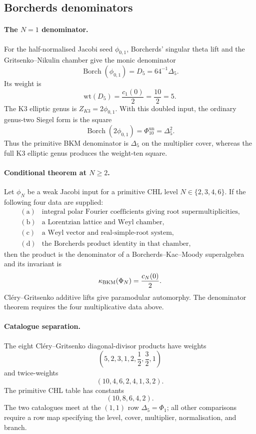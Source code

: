\subsection*{Borcherds denominators}
\label{subsec:conj1-borcherds-denominators}

\paragraph{The \(N=1\) denominator.}
For the half-normalised Jacobi seed \(\phi_{0,1}\), Borcherds'
singular theta lift and the Gritsenko--Nikulin chamber give the monic
denominator
\[
        \operatorname{Borch}(\phi_{0,1})=D_5=64^{-1}\Delta_5 .
\]
Its weight is
\[
        \mathrm{wt}(D_5)=\frac{c_1(0)}{2}=\frac{10}{2}=5 .
\]
The K3 elliptic genus is \(Z_{K3}=2\phi_{0,1}\).  With this doubled input,
the ordinary genus-two Siegel form is the square
\[
        \operatorname{Borch}(2\phi_{0,1})
        =
        \Phi_{10}^{\mathrm{un}}
        =
        \Delta_5^2 .
\]
Thus the primitive BKM denominator is \(\Delta_5\) on the multiplier cover,
whereas the full K3 elliptic genus produces the weight-ten square.

\paragraph{Conditional theorem at \(N\geq 2\).}
Let \(\phi_N\) be a weak Jacobi input for a primitive CHL level
\(N\in\{2,3,4,6\}\).  If the following four data are supplied:
\[
\begin{array}{ll}
\mathrm{(a)}&\text{integral polar Fourier coefficients giving root
supermultiplicities,}\\
\mathrm{(b)}&\text{a Lorentzian lattice and Weyl chamber,}\\
\mathrm{(c)}&\text{a Weyl vector and real-simple-root system,}\\
\mathrm{(d)}&\text{the Borcherds product identity in that chamber,}
\end{array}
\]
then the product is the denominator of a Borcherds--Kac--Moody
superalgebra and its invariant is
\[
        \kappa_{\mathrm{BKM}}(\Phi_N)=\frac{c_N(0)}{2}.
\]
Cl\'ery--Gritsenko additive lifts give paramodular automorphy.  The
denominator theorem requires the four multiplicative data above.

\paragraph{Catalogue separation.}
The eight Cl\'ery--Gritsenko diagonal-divisor products have weights
\[
        \left(5,2,3,1,2,\frac12,\frac32,1\right)
\]
and twice-weights
\[
        (10,4,6,2,4,1,3,2).
\]
The primitive CHL table has constants
\[
        (10,8,6,4,2).
\]
The two catalogues meet at the \((1,1)\) row \(\Delta_5=\Phi_1\); all other
comparisons require a row map specifying the level, cover, multiplier,
normalisation, and branch.

